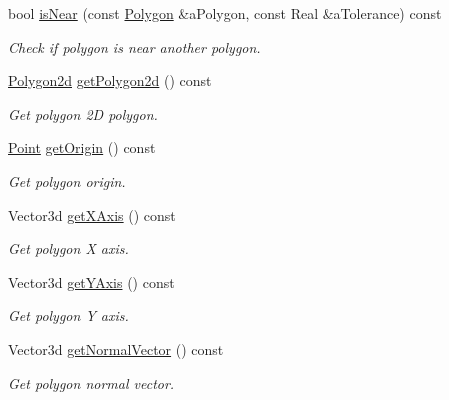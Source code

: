 \begin{DoxyCompactItemize}
bool \hyperlink{classlibrary_1_1math_1_1geom_1_1d3_1_1objects_1_1_polygon_aaf1a30fb520b1165d60017ab83a8f69b}{is\+Near} (const \hyperlink{classlibrary_1_1math_1_1geom_1_1d3_1_1objects_1_1_polygon}{Polygon} \&a\+Polygon, const Real \&a\+Tolerance) const
\begin{DoxyCompactList}\small\item\em Check if polygon is near another polygon. \end{DoxyCompactList}\item 
\hyperlink{namespacelibrary_1_1math_1_1geom_1_1d3_1_1objects_ae339035ccf9a6f4f0d2945fdcfd76f95}{Polygon2d} \hyperlink{classlibrary_1_1math_1_1geom_1_1d3_1_1objects_1_1_polygon_a52a2a342758ed8570aecefa1a18311ec}{get\+Polygon2d} () const
\begin{DoxyCompactList}\small\item\em Get polygon 2D polygon. \end{DoxyCompactList}\item 
\hyperlink{classlibrary_1_1math_1_1geom_1_1d3_1_1objects_1_1_point}{Point} \hyperlink{classlibrary_1_1math_1_1geom_1_1d3_1_1objects_1_1_polygon_add4c768333dd8a58e700b84c67ab1df1}{get\+Origin} () const
\begin{DoxyCompactList}\small\item\em Get polygon origin. \end{DoxyCompactList}\item 
Vector3d \hyperlink{classlibrary_1_1math_1_1geom_1_1d3_1_1objects_1_1_polygon_a1d16c3229601acc55e9ad25510f821e2}{get\+X\+Axis} () const
\begin{DoxyCompactList}\small\item\em Get polygon X axis. \end{DoxyCompactList}\item 
Vector3d \hyperlink{classlibrary_1_1math_1_1geom_1_1d3_1_1objects_1_1_polygon_ac6677598019f6233c1c966b1ddd7914e}{get\+Y\+Axis} () const
\begin{DoxyCompactList}\small\item\em Get polygon Y axis. \end{DoxyCompactList}\item 
Vector3d \hyperlink{classlibrary_1_1math_1_1geom_1_1d3_1_1objects_1_1_polygon_a9df6a1cf7b2d48b9bca560d8794df831}{get\+Normal\+Vector} () const
\begin{DoxyCompactList}\small\item\em Get polygon normal vector. \end{DoxyCompactList}\item 

\end{DoxyCompactItemize}
